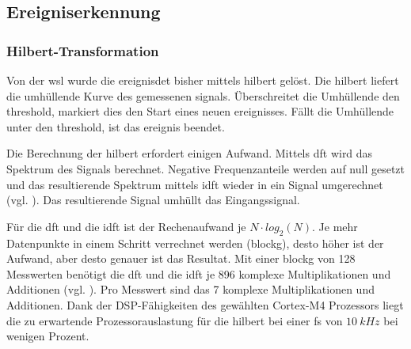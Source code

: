\subsection{Ereigniserkennung}\label{subsec.sw_ereignis}
\subsubsection{Hilbert-Transformation}
Von der \gls{wsl} wurde die \gls{ereignisdet} bisher mittels \gls{hilbert} gelöst. Die \gls{hilbert} liefert die umhüllende Kurve des gemessenen \gls{signal}s. Überschreitet die Umhüllende den \gls{threshold}, markiert dies den Start eines neuen \gls{ereignis}ses. Fällt die Umhüllende unter den \gls{threshold}, ist das \gls{ereignis} beendet.

Die Berechnung der \gls{hilbert} erfordert einigen Aufwand. Mittels \gls{dft} wird das Spektrum des Signals berechnet. Negative Frequenzanteile werden auf null gesetzt und das resultierende Spektrum mittels \gls{idft} wieder in ein Signal umgerechnet (vgl. \cite{wiki_hilbert}). Das resultierende Signal umhüllt das Eingangssignal. 

Für die \gls{dft} und die \gls{idft} ist der Rechenaufwand je \ensuremath{N \cdot log_2(N)}. Je mehr Datenpunkte in einem Schritt verrechnet werden (\gls{blockg}), desto höher ist der Aufwand, aber desto genauer ist das Resultat. Mit einer \gls{blockg} von 128 Messwerten benötigt die \gls{dft} und die \gls{idft} je 896 komplexe Multiplikationen und Additionen (vgl. \cite[Kap. 3, S. 48]{dsv1_hilbert}). Pro Messwert sind das 7 komplexe Multiplikationen und Additionen. Dank der DSP-Fähigkeiten des gewählten Cortex\texttrademark -M4 Prozessors liegt die zu erwartende Prozessorauslastung für die \gls{hilbert} bei einer \gls{fs} von \ensuremath{10~kHz} bei wenigen Prozent.

